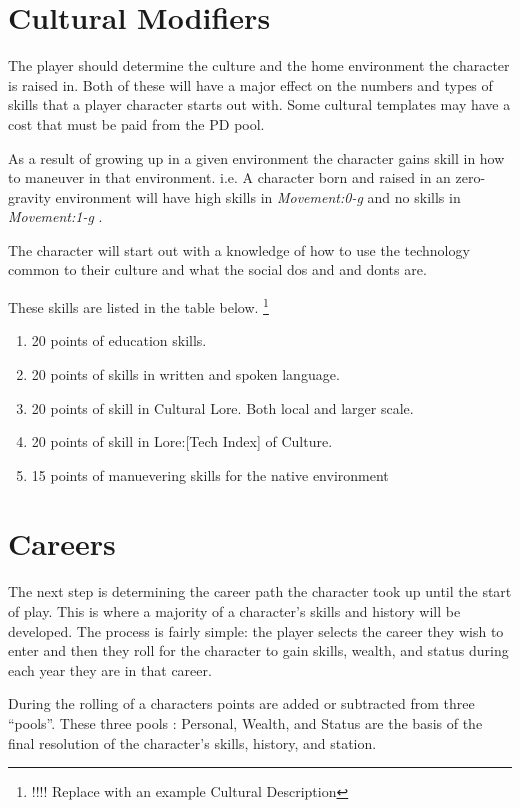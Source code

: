 \section{Cultural Modifiers}

The player should determine the culture and the home environment
the character is raised in. Both of these will have a major 
effect on the numbers and types of skills that a player character
starts out with. Some cultural templates may have a cost that must be 
paid from the PD pool.

As a result of growing up in a given environment the character 
gains skill in how to maneuver in that environment. i.e. A character
born and raised in an zero-gravity environment will have high skills
in {\em Movement:0-g } and no skills in {\em Movement:1-g }.

The character will start out with a knowledge of how to
use the technology common to their culture and what the social dos and
and donts are.

These skills are listed in the table below.
\footnote{!!!! Replace with an example Cultural Description }
\begin{enumerate}
	\item 20 points of education skills.
	\item 20 points of skills in written and spoken language.
	\item 20 points of skill in Cultural Lore. Both local and larger scale.
	\item 20 points of skill in Lore:[Tech Index] of Culture.
	\item 15 points of manuevering skills for the native environment
\end{enumerate}

\section{Careers}

The next step is determining the career path the character
took up until the start of play. This is where a majority of a character's
skills and history will be developed. The process is fairly simple:
the player selects the career they wish to enter and then they roll 
for the character to gain skills, wealth, and status during each 
year they are in that career. 

During the rolling of a characters points are added
or subtracted from three ``pools''. These three pools : Personal,
Wealth, and Status are the basis of the final resolution of
the character's skills, history, and station.

